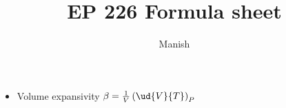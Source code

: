 \documentclass[10pt]{article}
\title{EP 226 Formula sheet}
\author{Manish}
\begin{document}
\maketitle
\begin{itemize}
\item Volume expansivity $\beta=\frac1{V}\left(\ud{V}{T}\right)_P$
\end{itemize}
\end{document}
